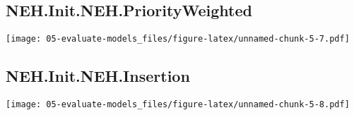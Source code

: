 \documentclass[
]{article}
\begin{document}
\hypertarget{neh.init.neh.priorityweighted}{%
\subsection{NEH.Init.NEH.PriorityWeighted}\label{neh.init.neh.priorityweighted}}

\texttt{[image: 05-evaluate-models\_files/figure-latex/unnamed-chunk-5-7.pdf]}

\hypertarget{neh.init.neh.insertion}{%
\subsection{NEH.Init.NEH.Insertion}\label{neh.init.neh.insertion}}

\texttt{[image: 05-evaluate-models\_files/figure-latex/unnamed-chunk-5-8.pdf]}
\end{document}
